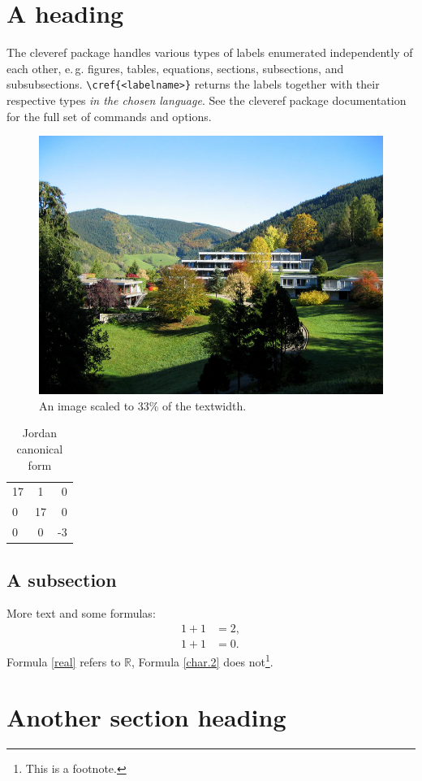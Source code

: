 \documentclass{snapshotmfo}
\begin{document}
\section{A heading}
\label{sec:heading}
The cleveref package handles various types of labels enumerated independently of each other, e.\,g.
figures, tables, equations, sections, subsections, and subsubsections.
\verb+\cref{<labelname>}+ returns the labels together with their respective types {\em in the chosen language}.
See the cleveref package documentation for the full set of commands and options.

\begin{figure}[ht]
	\centering
	\includegraphics[width= 0.33 \textwidth]{mfo.jpg}
	\caption{An image scaled to 33\% of the textwidth.}
	\label{fig:Institute}
\end{figure}

\begin{table}[ht]
	\caption{Jordan canonical form}
	\begin{tabular}{ l c r }
		17 & 1 & 0 \\
		0 & 17 & 0 \\
		0 & 0 & -3 \\
	\end{tabular}
	\label{tab:Jordan}
\end{table}

\subsection{A subsection}
\label{subsec:first}
More text and some formulas:
\begin{align}\label{real}
	1+1&=2,\\\label{char.2}
	1+1&=0.
\end{align}
Formula \eqref{real} refers to $\mathbb{R}$, Formula \eqref{char.2} does not\footnote{This is a footnote.\label{footnote}}.


\section{Another section heading}
\label{sec:another}
\end{document}
